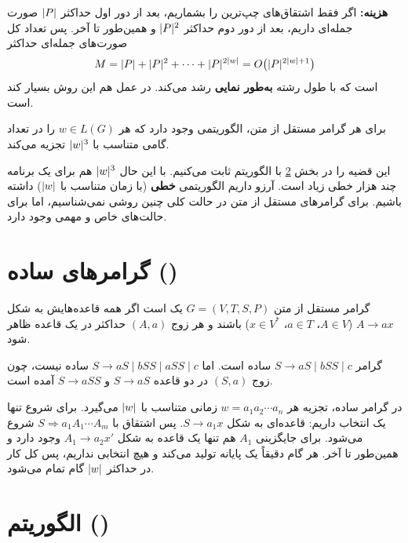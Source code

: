 \textbf{هزینه:} اگر فقط اشتقاق‌های چپ‌ترین را بشماریم، بعد از دور اول حداکثر $\lvert P\rvert$ صورت جمله‌ای داریم، بعد از دور دوم حداکثر $\lvert P\rvert^2$ و همین‌طور تا آخر. پس تعداد کل صورت‌های جمله‌ای حداکثر
\[M=\lvert P\rvert+\lvert P\rvert^2+\cdots+\lvert P\rvert^{2\lvert w\rvert}=O\big(\lvert P\rvert^{2\lvert w\rvert+1}\big)\]
است که با طول رشته \textbf{به‌طور نمایی} رشد می‌کند. در عمل هم این روش بسیار کند است.

\begin{theorem}
برای هر گرامر مستقل از متن، الگوریتمی وجود دارد که هر $w\in L(G)$ را در تعداد گامی متناسب با $\lvert w\rvert^3$ تجزیه می‌کند.
\end{theorem}

این قضیه را در بخش \ref{sec:cyk} با الگوریتم  ثابت می‌کنیم. با این حال $\lvert w\rvert^3$ هم برای یک برنامه چند هزار خطی زیاد است. آرزو داریم الگوریتمی \textbf{خطی} (با زمان متناسب با $\lvert w\rvert$) داشته باشیم. برای گرامرهای مستقل از متن در حالت کلی چنین روشی نمی‌شناسیم، اما برای حالت‌های خاص و مهمی وجود دارد.

\section{گرامرهای ساده ()}

\begin{definition}
گرامر مستقل از متن $G=(V,T,S,P)$ یک  است اگر همه قاعده‌هایش به شکل $A\to ax$ ($A\in V$، $a\in T$، $x\in V^*$) باشند و هر زوج $(A,a)$ حداکثر در یک قاعده ظاهر شود.
\end{definition}

\begin{example}
گرامر $S\to aS\mid bSS\mid c$ ساده است. اما $S\to aS\mid bSS\mid aSS\mid c$ ساده نیست، چون زوج $(S,a)$ در دو قاعده $S\to aS$ و $S\to aSS$ آمده است.
\end{example}

در گرامر ساده، تجزیه هر $w=a_1a_2\cdots a_n$ زمانی متناسب با $\lvert w\rvert$ می‌گیرد. برای شروع تنها یک انتخاب داریم: قاعده‌ای به شکل $S\to a_1x$. پس اشتقاق با $S\Rightarrow a_1A_1\cdots A_m$ شروع می‌شود. برای جایگزینی $A_1$ هم تنها یک قاعده به شکل $A_1\to a_2x'$ وجود دارد و همین‌طور تا آخر. هر گام دقیقاً یک پایانه تولید می‌کند و هیچ انتخابی نداریم، پس کل کار در حداکثر $\lvert w\rvert$ گام تمام می‌شود.

\section{الگوریتم  ()}\label{sec:cyk}

